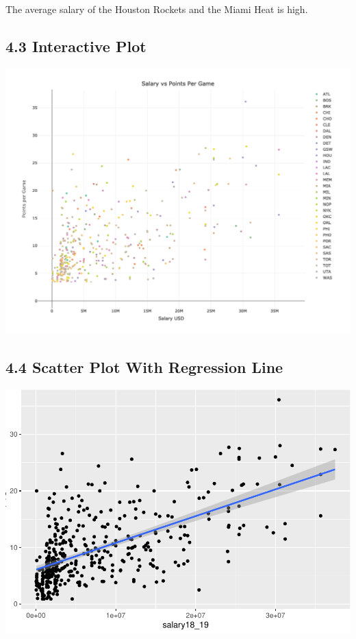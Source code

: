 \documentclass[]{article}
\begin{document}
The average salary of the Houston Rockets and the Miami Heat is high.

\subsection{4.3 Interactive Plot}\label{interactive-plot}

\includegraphics{Final_Report_files/figure-latex/unnamed-chunk-15-1.png}

\subsection{4.4 Scatter Plot With Regression
Line}\label{scatter-plot-with-regression-line}

\includegraphics{Final_Report_files/figure-latex/unnamed-chunk-16-1.pdf}
\end{document}
